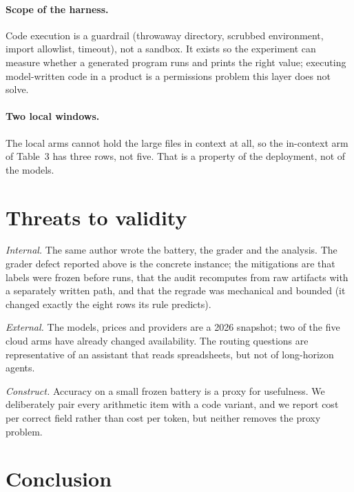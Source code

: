 \documentclass[11pt]{article}
\begin{document}
\paragraph{Scope of the harness.} Code execution is a guardrail (throwaway directory, scrubbed
environment, import allowlist, timeout), not a sandbox. It exists so the experiment can measure
whether a generated program runs and prints the right value; executing model-written code in a
product is a permissions problem this layer does not solve.

\paragraph{Two local windows.} The local arms cannot hold the large files in context at all, so
the in-context arm of Table~3 has three rows, not five. That is a property of the deployment, not
of the models.

\section{Threats to validity}

\emph{Internal.} The same author wrote the battery, the grader and the analysis. The grader defect
reported above is the concrete instance; the mitigations are that labels were frozen before runs,
that the audit recomputes from raw artifacts with a separately written path, and that the
regrade was mechanical and bounded (it changed exactly the eight rows its rule predicts).

\emph{External.} The models, prices and providers are a 2026 snapshot; two of the five cloud arms
have already changed availability. The routing questions are representative of an assistant that
reads spreadsheets, but not of long-horizon agents.

\emph{Construct.} Accuracy on a small frozen battery is a proxy for usefulness. We deliberately
pair every arithmetic item with a code variant, and we report cost per correct field rather than
cost per token, but neither removes the proxy problem.

\section{Conclusion}
\end{document}

